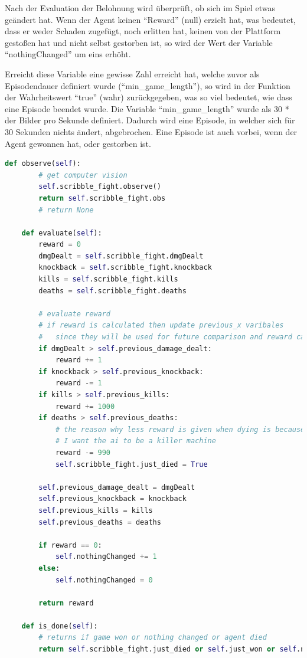 Nach der Evaluation der Belohnung wird überprüft, ob sich im Spiel etwas geändert hat. Wenn der Agent keinen ``Reward'' (null) erzielt hat, was bedeutet, dass er weder Schaden zugefügt, noch erlitten hat, keinen von der Plattform gestoßen hat und nicht selbst gestorben ist, so wird der Wert der Variable ``nothingChanged'' um eins erhöht.

Erreicht diese Variable eine gewisse Zahl erreicht hat, welche zuvor als Episodendauer definiert wurde (``min\_game\_length''), so wird in der Funktion der Wahrheitswert ``true'' (wahr) zurückgegeben, was so viel bedeutet, wie dass eine Episode beendet wurde. Die Variable ``min\_game\_length'' wurde als 30 * der Bilder pro Sekunde definiert. Dadurch wird eine Episode, in welcher sich für 30 Sekunden nichts ändert, abgebrochen. Eine Episode ist auch vorbei, wenn der Agent gewonnen hat, oder gestorben ist.

\begin{lstlisting}[language=Python,firstnumber=138]
    def observe(self):
        # get computer vision
        self.scribble_fight.observe()
        return self.scribble_fight.obs
        # return None

    def evaluate(self):
        reward = 0
        dmgDealt = self.scribble_fight.dmgDealt
        knockback = self.scribble_fight.knockback
        kills = self.scribble_fight.kills
        deaths = self.scribble_fight.deaths

        # evaluate reward
        # if reward is calculated then update previous_x varibales
        #   since they will be used for future comparison and reward calculation
        if dmgDealt > self.previous_damage_dealt:
            reward += 1
        if knockback > self.previous_knockback:
            reward -= 1
        if kills > self.previous_kills:
            reward += 1000
        if deaths > self.previous_deaths:
            # the reason why less reward is given when dying is because
            # I want the ai to be a killer machine
            reward -= 990
            self.scribble_fight.just_died = True

        self.previous_damage_dealt = dmgDealt
        self.previous_knockback = knockback
        self.previous_kills = kills
        self.previous_deaths = deaths

        if reward == 0:
            self.nothingChanged += 1
        else:
            self.nothingChanged = 0

        return reward

    def is_done(self):
        # returns if game won or nothing changed or agent died
        return self.scribble_fight.just_died or self.just_won or self.nothingChanged == self.min_game_length

\end{lstlisting}

